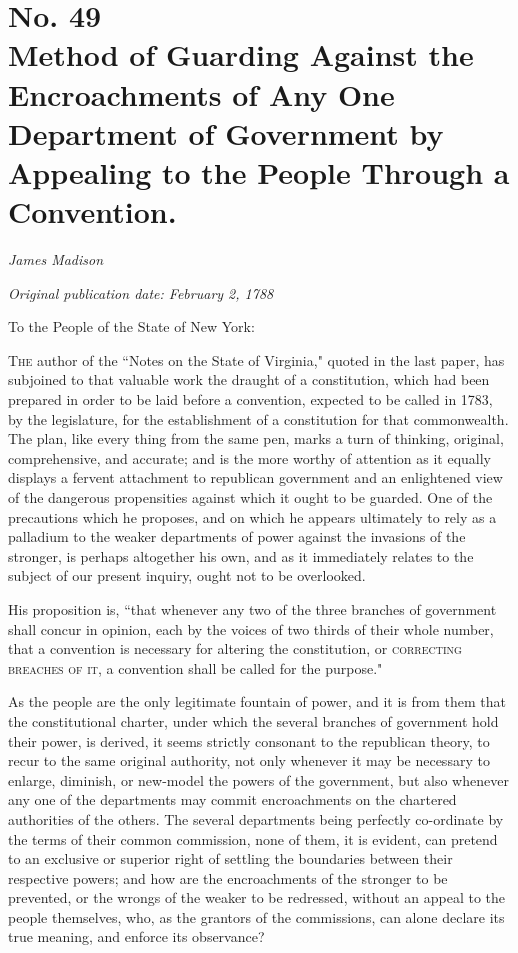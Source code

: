 \chapter[No. 49: Method of Guarding Against the Encroachments of Any One Department of Government by Appealing to the People Through a Convention.]{No. 49\\ {\small Method of Guarding Against the Encroachments of Any One Department of Government by Appealing to the People Through a Convention.}}

\textit{James Madison}

\textit{Original publication date: February 2, 1788}
\vspace{1cm}

To the People of the State of New York:
\vspace{.4cm}

\textsc{The} author of the ``Notes on the State of Virginia," quoted in the last paper, has subjoined to that valuable work the draught of a constitution, which had been prepared in order to be laid before a convention, expected to be called in 1783, by the legislature, for the establishment of a constitution for that commonwealth. 
The plan, like every thing from the same pen, marks a turn of thinking, original, comprehensive, and accurate; and is the more worthy of attention as it equally displays a fervent attachment to republican government and an enlightened view of the dangerous propensities against which it ought to be guarded. 
One of the precautions which he proposes, and on which he appears ultimately to rely as a palladium to the weaker departments of power against the invasions of the stronger, is perhaps altogether his own, and as it immediately relates to the subject of our present inquiry, ought not to be overlooked.

His proposition is, ``that whenever any two of the three branches of government shall concur in opinion, each by the voices of two thirds of their whole number, that a convention is necessary for altering the constitution, or \textsc{correcting breaches of it}, a convention shall be called for the purpose."

As the people are the only legitimate fountain of power, and it is from them that the constitutional charter, under which the several branches of government hold their power, is derived, it seems strictly consonant to the republican theory, to recur to the same original authority, not only whenever it may be necessary to enlarge, diminish, or new-model the powers of the government, but also whenever any one of the departments may commit encroachments on the chartered authorities of the others. 
The several departments being perfectly co-ordinate by the terms of their common commission, none of them, it is evident, can pretend to an exclusive or superior right of settling the boundaries between their respective powers; and how are the encroachments of the stronger to be prevented, or the wrongs of the weaker to be redressed, without an appeal to the people themselves, who, as the grantors of the commissions, can alone declare its true meaning, and enforce its observance?

